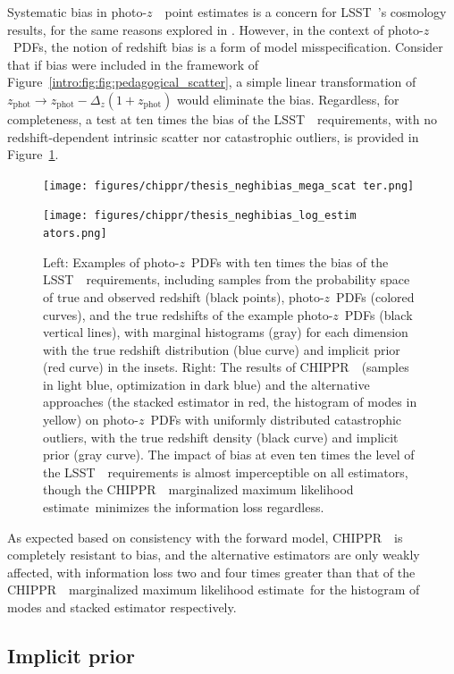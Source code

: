 \documentclass[iop]{emulateapj}
\newcommand{\Fig}[1]{Figure~\ref{#1}}
\newcommand{\project}[1]{{\textsc{#1}}~}
\newcommand{\lsst}{\project{LSST}}
\newcommand{\Chippr}{\project{CHIPPR}}
\newcommand{\pz}{photo-$z$~}
\newcommand{\pzpdf}{\pz PDF}
\newcommand{\mmle}{marginalized maximum likelihood estimate}
\begin{document}
Systematic bias in \pz\ point estimates is a concern for \lsst's cosmology 
results, for the same reasons explored in \citet{hoyle_dark_2017}.
However, in the context of \pzpdf s, the notion of redshift bias is a form of 
model misspecification.
Consider that if bias were included in the framework of 
Figure~\ref{intro:fig:fig:pedagogical_scatter}, a simple linear transformation 
of $z_{\mathrm{phot}} \to z_{\mathrm{phot}} - \Delta_{z} (1 + 
z_{\mathrm{phot}})$ would eliminate the bias.
Regardless, for completeness, a test at ten times the bias of the \lsst\ 
requirements, with no redshift-dependent intrinsic scatter nor catastrophic 
outliers, is provided in \Fig{fig:bias}.

\begin{figure}
	
\texttt{[image: figures/chippr/thesis\_neghibias\_mega\_scat
ter.png]}
	
\texttt{[image: figures/chippr/thesis\_neghibias\_log\_estim
ators.png]}
	\caption{
		Left: Examples of \pzpdf s with ten times the bias of the 
\lsst\ requirements, including samples from the probability space of true and 
observed redshift (black points), \pzpdf s (colored curves), and the true 
redshifts of the example \pzpdf s (black vertical lines), with marginal 
histograms (gray) for each dimension with the true redshift distribution (blue 
curve) and implicit prior (red curve) in the insets.
		Right: The results of \Chippr\ (samples in light blue, 
optimization in dark blue) and the alternative approaches (the stacked 
estimator in red, the histogram of modes in yellow) on \pzpdf s with uniformly 
distributed catastrophic outliers, with the true redshift density (black curve) 
and implicit prior (gray curve).
		The impact of bias at even ten times the level of the \lsst\ 
requirements is almost imperceptible on all estimators, though the \Chippr\ 
\mmle\ minimizes the information loss regardless.
	}
	\label{fig:bias}
\end{figure}

As expected based on consistency with the forward model, \Chippr\ is completely 
resistant to bias, and the alternative estimators are only weakly affected, 
with information loss two and four times greater than that of the \Chippr\ 
\mmle\ for the histogram of modes and stacked estimator respectively.

\subsection{Implicit prior}
\label{sec:interim}
\end{document}
